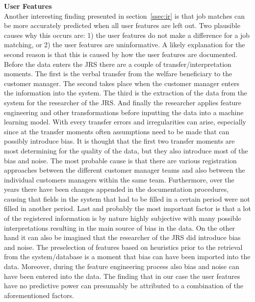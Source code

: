 \noindent
\textbf{User Features}\\
Another interesting finding presented in section~\ref{ssec:ir} is that job matches can be more accurately predicted when all user features are left out.  
Two plausible causes why this occurs are: 1) the user features do not make a difference for a job matching, or 2) the user features are uninformative.
A likely explanation for the second reason is that this is caused by how the user features are documented.
Before the data enters the JRS there are a couple of transfer/interpretation moments. 
The first is the verbal transfer from the welfare beneficiary to the customer manager.
The second takes place when the customer manager enters the information into the system.
The third is the extraction of the data from the system for the researcher of the JRS.
And finally the researcher applies feature engineering and other transformations before inputting the data into a machine learning model.
With every transfer errors and irregularities can arise, especially since at the transfer moments often assumptions need to be made that can possibly introduce bias.
It is thought that the first two transfer moments are most determining for the quality of the data, but they also introduce most of the bias and noise. The most probable cause is that there are various registration approaches between the different customer manager teams and also between the individual customers managers within the same team. 
Furthermore, over the years there have been changes appended in the documentation procedures, causing that fields in the system that had to be filled in a certain period were not filled  in another period.
Last and probably the most important factor is that a lot of the registered information is by nature highly subjective with many possible interpretations resulting in the main source of bias in the data. 
On the other hand it can also be imagined that the researcher of the JRS did introduce bias and noise.
The preselection of features based on heuristics prior to the retrieval from the system/database is a moment that bias can have been imported into the data.
Moreover, during the feature engineering process also bias and noise can have been entered into the data.
The finding that in our case the user features have no predictive power can presumably be attributed to a combination of the aforementioned factors. 


